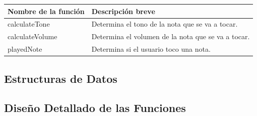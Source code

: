 \documentclass[a4paper,12pt]{article}
\begin{document}
\begin{tabular}{| p{30mm} | p{10cm} |}
        \hline
        \textbf{Nombre de la \mbox{función}} & \textbf{Descripción breve} \\
        \hline
        calculateTone & Determina el tono de la nota que se va a tocar.\\
        calculateVolume & Determina el volumen de la nota que se va a tocar.\\
        playedNote & Determina si el usuario toco una nota.\\
        \hline
\end{tabular}
\subsection{Estructuras de Datos}
\subsection{Diseño Detallado de las Funciones}
\end{document}
